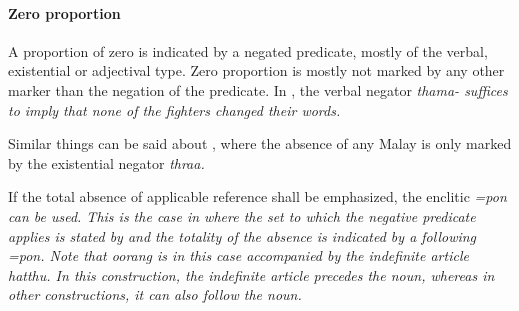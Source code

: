 



\paragraph{Zero proportion}\label{sec:func:Zeroproportion}
A proportion of zero is indicated by a negated predicate, mostly of the verbal, existential or adjectival type. Zero proportion is mostly not marked by any other marker than the negation of the predicate. In , the verbal negator \em thama- \em suffices to imply that none of the fighters changed their words.



Similar things can be said about , where the absence of any Malay is only marked by the existential negator \em thraa\em.


If the total absence of applicable reference shall be emphasized, the enclitic \em =pon \em can be used.
This is the case in  where the set to which the negative predicate applies is stated by  and the totality of the absence is indicated by a following \em =pon\em. Note that \em oorang \em is in this case accompanied by the indefinite article \em hatthu\em. In this construction, the indefinite article precedes the noun, whereas in other constructions, it can also follow the noun.

